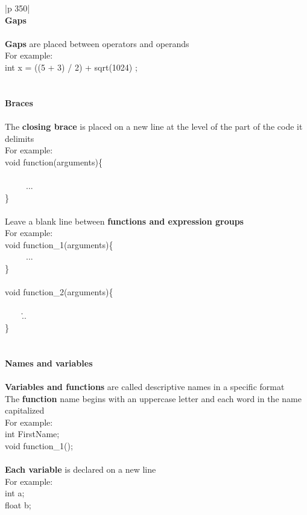 \documentclass{article}
\begin{document}
\begin{tabular}{ |p {350}| }
\hline \\
\textbf{\Large {Gaps}}\\ \\ 

\textbf{Gaps} are placed between operators and operands \\
For example: \\
int x = ((5 + 3) / 2) + sqrt(1024) ; \\ \\
\hline \\ 

\textbf{\Large {Braces}}\\ \\
The \textbf{closing brace} is placed on a new line at the level of the part of the code it delimits \\ 
For example: \\
void function(arguments)\{ \\ \\ 
\ \	\ \ \ ...\\
\} \\ \\
Leave a blank line between \textbf{functions and expression groups}\\
For example: \\
void function\_1(arguments)\{ \\ 
\ \	\ \ \ ...\\
\} \\  \\ 
void function\_2(arguments)\{ \\ \\ 
\ \	\ \ \...\\
\} \\ \\
\hline \\
\textbf{\Large {Names and variables}}\\ \\
\textbf{Variables and functions} are called descriptive names in a specific format\\
The \textbf{function} name begins with an uppercase letter and each word in the name capitalized\\
For example: \\
int FirstName;\\
void function\_1();\\ \\
\textbf{Each variable} is declared on a new line\\
For example: \\
int a;\\ 
float b;\\ \\
\hline 
\end{tabular} \\ \\
\end{document}
